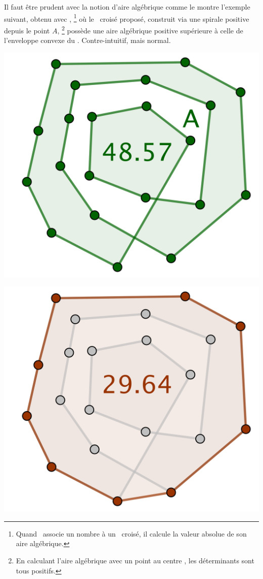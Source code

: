 \begin{remark}
	Il faut être prudent avec la notion d'aire algébrique comme le montre l'exemple suivant, obtenu avec \geogebra,%
    \footnote{
    	Quand \geogebra\ associe un nombre à un \ngone\ croisé, il calcule la valeur absolue de son aire algébrique.
    }
    où le \ngone\ croisé proposé, construit via une spirale positive depuis le point $A$,%
    \footnote{
    	En calculant l'aire algébrique avec un point \og au centre \fg, les déterminants sont tous positifs.
    } 
    possède une aire algébrique positive supérieure à celle de l'enveloppe convexe du \ngone. Contre-intuitif, mais normal.
    
    
    \begin{multicols}{2}
    	\small\itshape\centering
    	\includegraphics[scale=.3]{content/polygon/alg-area/ncycle-not-opti-pb-1.png}
    
    	\includegraphics[scale=.3]{content/polygon/alg-area/ncycle-not-opti-pb-2.png}
    \end{multicols}
\end{remark}


